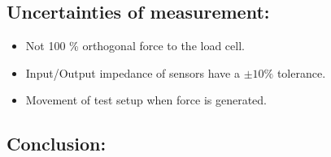 %

\subsection*{Uncertainties of measurement:}
\begin{itemize}
\item Not 100 \% orthogonal force to the load cell.
\item Input/Output impedance of sensors have a $\pm 10 \%$ tolerance.
\item Movement of test setup when force is generated.
\end{itemize}

\subsection*{Conclusion:}
